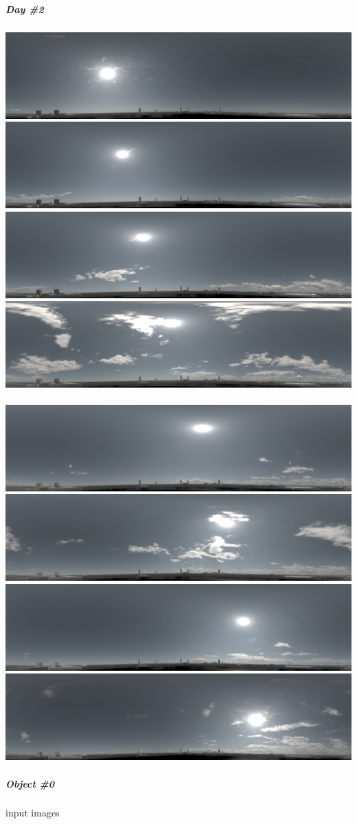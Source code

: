 \protect\hypertarget{extraresultsd2}{}{}

\clearpage
\hypertarget{day-2}{%
\subparagraph{Day \#2}\label{day-2}}

\includegraphics[width=0.24\linewidth]{semisynthetic/20160617/094515.png}
\includegraphics[width=0.24\linewidth]{semisynthetic/20160617/104118.png}
\includegraphics[width=0.24\linewidth]{semisynthetic/20160617/113719.png}
\includegraphics[width=0.24\linewidth]{semisynthetic/20160617/123326.png}\\
~\\
\includegraphics[width=0.24\linewidth]{semisynthetic/20160617/132927.png}
\includegraphics[width=0.24\linewidth]{semisynthetic/20160617/142534.png}
\includegraphics[width=0.24\linewidth]{semisynthetic/20160617/152137.png}
\includegraphics[width=0.24\linewidth]{semisynthetic/20160617/161740.png}\\

\hypertarget{object-0-1}{%
\subparagraph{Object \#0}\label{object-0-1}}

input images

